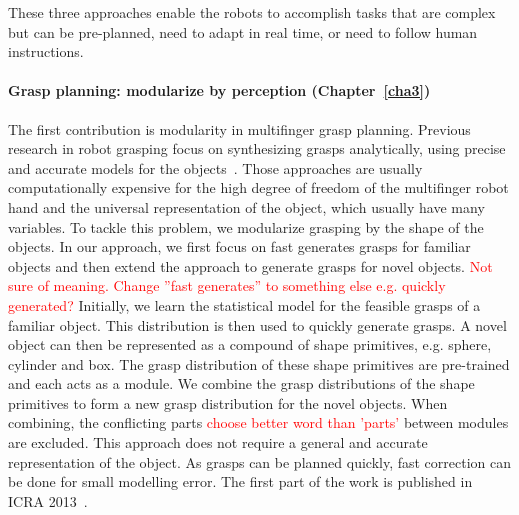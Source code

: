 These three approaches enable the robots to accomplish tasks that are complex but can be pre-planned, need to adapt in real time, or need to follow human instructions.



\paragraph{Grasp planning: modularize by perception (Chapter~\ref{cha3})}
The first contribution is modularity in multifinger grasp planning. Previous research in robot grasping focus on synthesizing grasps analytically, using precise and accurate models for the objects~\citep{sahbani2011overview}. Those approaches are usually computationally expensive for the high degree of freedom of the multifinger robot hand and the universal representation of the object, which usually have many variables. To tackle this problem, we modularize grasping by the shape of the objects. In our approach, we first focus on fast generates grasps for familiar objects and then extend the approach to generate grasps for novel objects.
\textcolor{red}{Not sure of meaning. Change ''fast generates'' to something else e.g. quickly generated?}
Initially, we learn the statistical model for the feasible grasps of a familiar object. This distribution is then used to quickly generate grasps. A novel object can then be represented as a compound of shape primitives, e.g. sphere, cylinder and box. The grasp distribution of these shape primitives are pre-trained and each acts as a module. We combine the grasp distributions of the shape primitives to form a new grasp distribution for the novel objects. When combining, the conflicting parts \textcolor{red}{choose better word than 'parts'} between modules are excluded.
This approach does not require a general and accurate representation of the object. As grasps can be planned quickly, fast correction can be done for small modelling error. The first part of the work is published in ICRA 2013~\citep{bidan2013grasp}.

